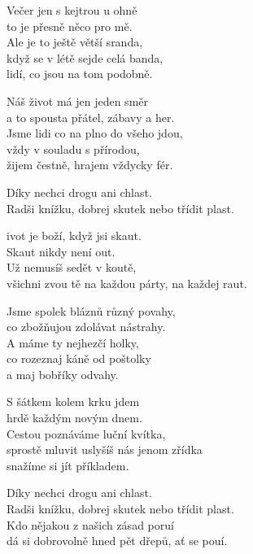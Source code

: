 
\ve{}
Večer jen s kejtrou u ohně\\
to je přesně něco pro mě.\\
Ale je to ještě větší sranda,\\
když se v létě sejde celá banda,\\
lidí, co jsou na tom podobně.

\ve{}
Náš život má jen jeden směr\\
a to spousta přátel, zábavy a her.\\
Jsme lidi co na plno do všeho jdou,\\
vždy v souladu s přírodou,\\
žijem čestně, hrajem vždycky fér.

\re{}
Díky nechci drogu ani chlast.\\
Radši knížku, dobrej skutek nebo třídit plast.

\cho{}
 \quad {}ivot je boží, když jsi skaut. \\
Skaut nikdy není out. \\
Už nemusíš sedět v koutě,\\
všichni zvou tě na každou párty, na každej raut.

\ve{}
Jsme spolek bláznů různý povahy,\\
co zbožňujou zdolávat nástrahy.\\
A máme ty nejhezčí holky,\\ 
co rozeznaj káně od poštolky\\
a maj bobříky odvahy.

\ve{}
S šátkem kolem krku jdem\\
hrdě každým novým dnem.\\
Cestou poznáváme luční kvítka,\\
sprostě mluvit uslyšíš nás jenom zřídka\\
snažíme si jít příkladem.

\re{}
Díky nechci drogu ani chlast.\\
Radši knížku, dobrej skutek nebo třídit plast.\\
Kdo nějakou z našich zásad poruí\\
dá si dobrovolně hned pět dřepů, ať se pouí.

\cho{}
\cho{}

\esong{}
